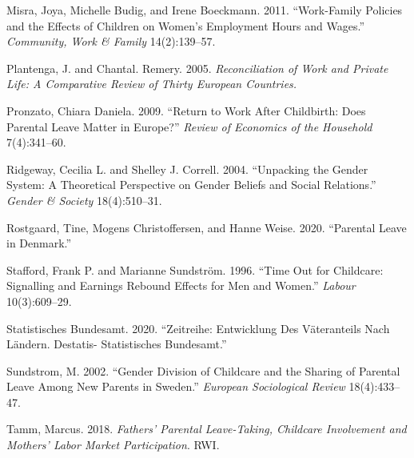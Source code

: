 \documentclass[
  12pt,
]{article}
\begin{document}
\leavevmode\hypertarget{ref-misra_work-family_2011}{}%
Misra, Joya, Michelle Budig, and Irene Boeckmann. 2011. ``Work-Family Policies and the Effects of Children on Women's Employment Hours and Wages.'' \emph{Community, Work \& Family} 14(2):139--57.

\leavevmode\hypertarget{ref-plantenga_reconciliation_2005}{}%
Plantenga, J. and Chantal. Remery. 2005. \emph{Reconciliation of Work and Private Life: A Comparative Review of Thirty European Countries.}

\leavevmode\hypertarget{ref-pronzato_return_2009}{}%
Pronzato, Chiara Daniela. 2009. ``Return to Work After Childbirth: Does Parental Leave Matter in Europe?'' \emph{Review of Economics of the Household} 7(4):341--60.

\leavevmode\hypertarget{ref-ridgeway_unpacking_2004}{}%
Ridgeway, Cecilia L. and Shelley J. Correll. 2004. ``Unpacking the Gender System: A Theoretical Perspective on Gender Beliefs and Social Relations.'' \emph{Gender \& Society} 18(4):510--31.

\leavevmode\hypertarget{ref-rostgaard_parental_2020}{}%
Rostgaard, Tine, Mogens Christoffersen, and Hanne Weise. 2020. ``Parental Leave in Denmark.''

\leavevmode\hypertarget{ref-stafford_time_1996}{}%
Stafford, Frank P. and Marianne Sundström. 1996. ``Time Out for Childcare: Signalling and Earnings Rebound Effects for Men and Women.'' \emph{Labour} 10(3):609--29.

\leavevmode\hypertarget{ref-statistisches_bundesamt_zeitreihe_2020}{}%
Statistisches Bundesamt. 2020. ``Zeitreihe: Entwicklung Des Väteranteils Nach Ländern. Destatis- Statistisches Bundesamt.''

\leavevmode\hypertarget{ref-sundstrom_gender_2002}{}%
Sundstrom, M. 2002. ``Gender Division of Childcare and the Sharing of Parental Leave Among New Parents in Sweden.'' \emph{European Sociological Review} 18(4):433--47.

\leavevmode\hypertarget{ref-tamm_fathers_2018}{}%
Tamm, Marcus. 2018. \emph{Fathers' Parental Leave-Taking, Childcare Involvement and Mothers' Labor Market Participation}. RWI.
\end{document}
